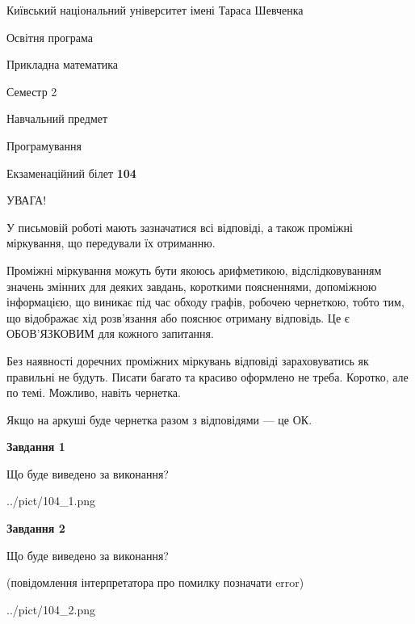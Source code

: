 \documentclass[12pt, ukrainian]{article}
\begin{document}
{{\begin {small}\par
{ \center  Київський національний університет імені Тараса Шевченка \par}
{\parbox {5 cm}{Освітня програма \hfill}{\parbox {7 cm}{Прикладна математика\hfill}}\parbox {6 cm}{\hfill Семестр 2}}\par
{\parbox {5 cm} {Навчальний предмет \hfill}\parbox {7 cm}{Програмування \hfill}\parbox {6cm}{\hfill}\par}\vspace{-7pt} \end{small}}{\center Екзаменаційний білет \No \textbf
{ 104 }\par}}
{
\begin {large}
УВАГА!

У письмовій роботі мають зазначатися всі відповіді, а також проміжні міркування, що передували їх отриманню.

Проміжні міркування можуть бути якоюсь арифметикою, відслідковуванням зна\-чень змінних для деяких завдань,
короткими поясненнями, допоміжною інформацією, що виникає під час обходу графів, робочею чернеткою,
тобто тим, що відображає хід розв’язання або пояснює отриману відповідь.
Це є ОБОВ’ЯЗКОВИМ для кожного запитання.

Без наявності доречних проміжних міркувань відповіді зараховуватись як правиль\-ні не будуть.
Писати багато та красиво оформлено не треба. Коротко, але по темі. Можли\-во, навіть чернетка.

Якщо на аркуші буде чернетка разом з відповідями --- це ОК.

\newpage

{\begin {center}\textbf{Завдання 1}\end {center}}\par
Що буде виведено за виконання?\par
\begin{center}
	{../pict/104_1.png}
\end{center}
\newpage

{\begin {center}\textbf{Завдання 2}\end {center}}\par
Що буде виведено за виконання?\par
 (повідомлення інтерпретатора про помилку позначати error)\par
\begin{center}
	{../pict/104_2.png}
\end{center}
\newpage


\end{large}}
\end{document}
